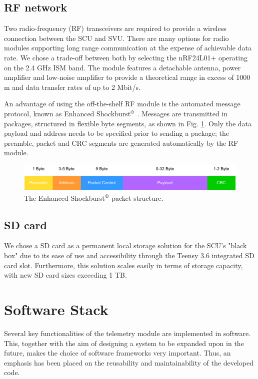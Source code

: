 \documentclass[a4paper,conference]{IEEEtran}
\begin{document}
\subsection{RF network} %
Two radio-frequency (RF) transceivers are required to provide a wireless connection between the SCU and SVU. There are many options for radio modules supporting long range communication at the expense of achievable data rate. We chose a trade-off between both by selecting the nRF24L01+ operating on the 2.4 GHz ISM band. The module features a detachable antenna, power amplifier and low-noise amplifier to provide a theoretical range in excess of 1000 m and data transfer rates of up to 2 Mbit/s.

An advantage of using the off-the-shelf RF module is the automated message protocol, known as Enhanced Shockburst$^\copyright$ \cite{shockburst}. Messages are transmitted in packages, structured in flexible byte segments, as shown in Fig. \ref{fig:shockburst}. Only the data payload and address needs to be specified prior to sending a package; the preamble, packet and CRC segments are generated automatically by the RF module.

\begin{figure}
    \centering
    \includegraphics[width=\linewidth]{documentation/images/EnhancedShockburst.pdf}
    \caption{The Enhanced Shockburst$^\copyright$ packet structure.}
    \label{fig:shockburst}
\end{figure}

\subsection{SD card}

We chose a SD card as a permanent local storage solution for the SCU's "black box" due to its ease of use and accessibility through the Teensy 3.6 integrated SD card slot. Furthermore, this solution scales easily in terms of storage capacity, with new SD card sizes exceeding 1 TB.

\section{Software Stack}

Several key functionalities of the telemetry module are implemented in software. This, together with the aim of designing a system to be expanded upon in the future, makes the choice of software frameworks very important. Thus, an emphasis has been placed on the reusability and maintainability of the developed code.
\end{document}
